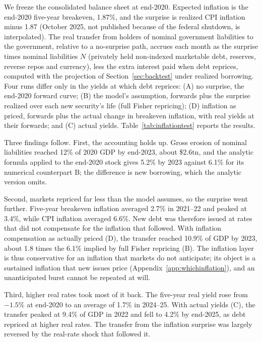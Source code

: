 We freeze the consolidated balance sheet at end-2020. Expected inflation is the end-2020 five-year breakeven, 1.87\%, and the surprise is realized CPI inflation minus 1.87 (October 2025, not published because of the federal shutdown, is interpolated). The real transfer from holders of nominal government liabilities to the government, relative to a no-surprise path, accrues each month as the surprise times nominal liabilities $N$ (privately held non-indexed marketable debt, reserves, reverse repos and currency), less the extra interest paid when debt reprices, computed with the projection of Section~\ref{sec:backtest} under realized borrowing. Four runs differ only in the yields at which debt reprices: (A) no surprise, the end-2020 forward curve; (B) the model's assumption, forwards plus the surprise realized over each new security's life (full Fisher repricing); (D) inflation as priced, forwards plus the actual change in breakeven inflation, with real yields at their forwards; and (C) actual yields. Table~\ref{tab:inflationtest} reports the results.



Three findings follow. First, the accounting holds up. Gross erosion of nominal liabilities reached 12\% of 2020 GDP by end-2023, about \$2.6tn, and the analytic formula applied to the end-2020 stock gives 5.2\% by 2023 against 6.1\% for its numerical counterpart B; the difference is new borrowing, which the analytic version omits.

Second, markets repriced far less than the model assumes, so the surprise went further. Five-year breakeven inflation averaged 2.7\% in 2021--22 and peaked at 3.4\%, while CPI inflation averaged 6.6\%. New debt was therefore issued at rates that did not compensate for the inflation that followed. With inflation compensation as actually priced (D), the transfer reached 10.9\% of GDP by 2023, about 1.8 times the 6.1\% implied by full Fisher repricing (B). The inflation layer is thus conservative for an inflation that markets do not anticipate; its object is a sustained inflation that new issues price (Appendix~\ref{app:whichinflation}), and an unanticipated burst cannot be repeated at will.

Third, higher real rates took most of it back. The five-year real yield rose from $-1.5$\% at end-2020 to an average of 1.7\% in 2024--25. With actual yields (C), the transfer peaked at 9.4\% of GDP in 2022 and fell to 4.2\% by end-2025, as debt repriced at higher real rates. The transfer from the inflation surprise was largely reversed by the real-rate shock that followed it.

